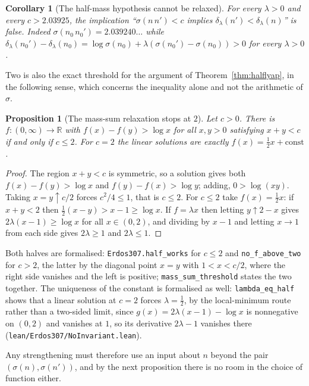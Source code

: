 \documentclass[11pt]{article}
\newtheorem{proposition}[theorem]{Proposition}
\newtheorem{corollary}[theorem]{Corollary}
\theoremstyle{definition}
\begin{document}
\begin{corollary}[The half-mass hypothesis cannot be relaxed]\label{cor:halfsharp}
For every $\lambda>0$ and every $c>2.03925$, the implication
``$\sigma(n\,n')<c$ implies $\delta_\lambda(n')<\delta_\lambda(n)$'' is false. Indeed
$\sigma(n_0\,n_0')=2.039240\ldots$ while
$\delta_\lambda(n_0')-\delta_\lambda(n_0)=\log\sigma(n_0)+\lambda(\sigma(n_0')-\sigma(n_0))>0$ for
every $\lambda>0$.
\end{corollary}

Two is also the exact threshold for the argument of Theorem~\ref{thm:halflyap}, in the following
sense, which concerns the inequality alone and not the arithmetic of $\sigma$.

\begin{proposition}[The mass-sum relaxation stops at $2$]\label{prop:masssumthreshold}
Let $c>0$. There is $f:(0,\infty)\to\mathbb{R}$ with $f(x)-f(y)>\log x$ for all $x,y>0$ satisfying
$x+y<c$ if and only if $c\le2$. For $c=2$ the linear solutions are exactly $f(x)=\tfrac12x+\text{const}$.
\end{proposition}
\begin{proof}
The region $x+y<c$ is symmetric, so a solution gives both $f(x)-f(y)>\log x$ and $f(y)-f(x)>\log y$;
adding, $0>\log(xy)$. Taking $x=y\uparrow c/2$ forces $c^2/4\le1$, that is $c\le2$. For $c\le2$ take
$f(x)=\tfrac12x$: if $x+y<2$ then $\tfrac12(x-y)>x-1\ge\log x$. If $f=\lambda x$ then letting
$y\uparrow2-x$ gives $2\lambda(x-1)\ge\log x$ for all $x\in(0,2)$, and dividing by $x-1$ and letting
$x\to1$ from each side gives $2\lambda\ge1$ and $2\lambda\le1$.
\end{proof}

Both halves are formalised: \texttt{Erdos307.half\_works} for $c\le2$ and
\texttt{no\_f\_above\_two} for $c>2$, the latter by the diagonal point $x=y$ with $1<x<c/2$, where
the right side vanishes and the left is positive; \texttt{mass\_sum\_threshold} states the two
together. The uniqueness of the constant is formalised as well: \texttt{lambda\_eq\_half} shows that a linear solution at $c=2$ forces $\lambda=\tfrac12$, by the local-minimum route rather than a two-sided limit, since $g(x)=2\lambda(x-1)-\log x$ is nonnegative on $(0,2)$ and vanishes at $1$, so its derivative $2\lambda-1$ vanishes there \textup{(\texttt{lean/Erdos307/NoInvariant.lean})}.

Any strengthening must therefore use an input about $n$ beyond the pair
$(\sigma(n),\sigma(n'))$, and by the next proposition there is no room in the choice of function
either.
\end{document}
